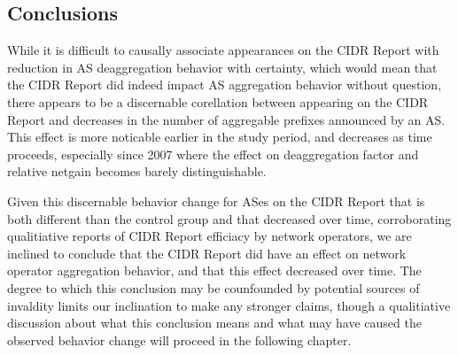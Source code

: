 %
%
%
%
%
%


\subsection{Conclusions}
While it is difficult to causally associate appearances on the CIDR Report with
reduction in AS deaggregation behavior with certainty, which would mean that
the CIDR Report did indeed impact AS aggregation behavior without question,
there appears to be a discernable corellation between appearing on the CIDR
Report and decreases in the number of aggregable prefixes announced by an AS.
This effect is more noticable earlier in the study period, and decreases as
time proceeds, especially since 2007 where the effect on deaggregation factor
and relative netgain becomes barely distinguishable.

Given this discernable behavior change for ASes on the CIDR Report that is
both different than the control group and that decreased over time,
corroborating qualitiative reports of CIDR Report efficiacy by network
operators, we are inclined to conclude that the CIDR Report did have an effect
on network operator aggregation behavior, and that this effect decreased over
time. The degree to which this conclusion may be counfounded by potential
sources of invaldity limits our inclination to make any stronger claims, though
a qualitiative discussion about what this conclusion means and what may have
caused the observed behavior change will proceed in the following chapter.


